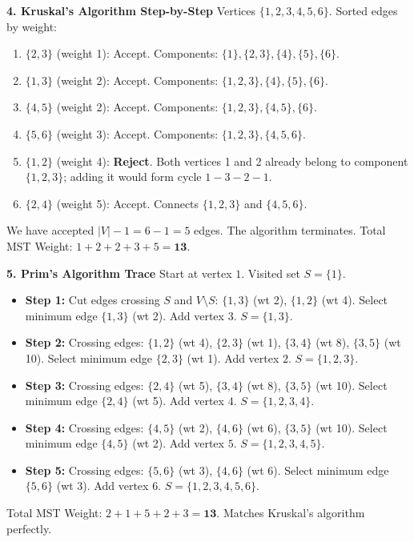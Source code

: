 \textbf{4. Kruskal's Algorithm Step-by-Step}
Vertices $\{1, 2, 3, 4, 5, 6\}$.
Sorted edges by weight:
\begin{enumerate}
    \item $\{2, 3\}$ (weight 1): Accept. Components: $\{1\}, \{2, 3\}, \{4\}, \{5\}, \{6\}$.
    \item $\{1, 3\}$ (weight 2): Accept. Components: $\{1, 2, 3\}, \{4\}, \{5\}, \{6\}$.
    \item $\{4, 5\}$ (weight 2): Accept. Components: $\{1, 2, 3\}, \{4, 5\}, \{6\}$.
    \item $\{5, 6\}$ (weight 3): Accept. Components: $\{1, 2, 3\}, \{4, 5, 6\}$.
    \item $\{1, 2\}$ (weight 4): \textbf{Reject}. Both vertices 1 and 2 already belong to component $\{1, 2, 3\}$; adding it would form cycle $1 - 3 - 2 - 1$.
    \item $\{2, 4\}$ (weight 5): Accept. Connects $\{1, 2, 3\}$ and $\{4, 5, 6\}$.
\end{enumerate}
We have accepted $|V| - 1 = 6 - 1 = 5$ edges. The algorithm terminates.
Total MST Weight: $1 + 2 + 2 + 3 + 5 = \mathbf{13}$.

\textbf{5. Prim's Algorithm Trace}
Start at vertex $1$. Visited set $S = \{1\}$.
\begin{itemize}
    \item \textbf{Step 1:} Cut edges crossing $S$ and $V \setminus S$: $\{1, 3\}$ (wt 2), $\{1, 2\}$ (wt 4).
    Select minimum edge $\{1, 3\}$ (wt 2). Add vertex $3$. $S = \{1, 3\}$.
    \item \textbf{Step 2:} Crossing edges: $\{1, 2\}$ (wt 4), $\{2, 3\}$ (wt 1), $\{3, 4\}$ (wt 8), $\{3, 5\}$ (wt 10).
    Select minimum edge $\{2, 3\}$ (wt 1). Add vertex $2$. $S = \{1, 2, 3\}$.
    \item \textbf{Step 3:} Crossing edges: $\{2, 4\}$ (wt 5), $\{3, 4\}$ (wt 8), $\{3, 5\}$ (wt 10).
    Select minimum edge $\{2, 4\}$ (wt 5). Add vertex $4$. $S = \{1, 2, 3, 4\}$.
    \item \textbf{Step 4:} Crossing edges: $\{4, 5\}$ (wt 2), $\{4, 6\}$ (wt 6), $\{3, 5\}$ (wt 10).
    Select minimum edge $\{4, 5\}$ (wt 2). Add vertex $5$. $S = \{1, 2, 3, 4, 5\}$.
    \item \textbf{Step 5:} Crossing edges: $\{5, 6\}$ (wt 3), $\{4, 6\}$ (wt 6).
    Select minimum edge $\{5, 6\}$ (wt 3). Add vertex $6$. $S = \{1, 2, 3, 4, 5, 6\}$.
\end{itemize}
Total MST Weight: $2 + 1 + 5 + 2 + 3 = \mathbf{13}$. Matches Kruskal's algorithm perfectly.

